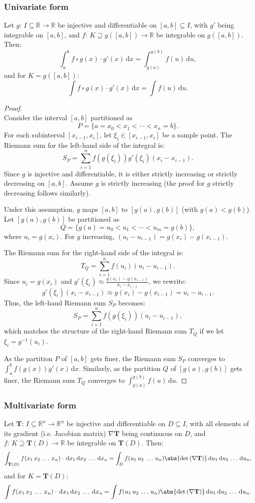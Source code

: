 \documentclass[a4paper,12pt]{report}
\begin{document}
\subsubsection{Univariate form}
Let $g:\,I\subseteq\mathbb{R}\to\mathbb{R}$ be injective and differentiable on $[a,b]\subseteq I$, with $g'$ being integrable on $[a,b]$, and $f:\,K\supseteq g([a,b])\to\mathbb{R}$ be integrable on $g([a,b])$. Then:
\[\int_a^bf\circ g(x)\cdot g'(x)\,\mathrm{d}x=\int_{g(a)}^{g(b)}f(u)\,\mathrm{d}u,\]
and for $K=g([a,b])$:
\[\int f\circ g(x)\cdot g'(x)\,\mathrm{d}x=\int f(u)\,\mathrm{d}u.\]
\begin{proof}\mbox{}\\
Consider the interval \([a, b]\) partitioned as
\[P = \{a = x_0 < x_1 < \cdots < x_n = b\}.\]
For each subinterval \([x_{i-1}, x_i]\), let \(\xi_i \in [x_{i-1}, x_i]\) be a sample point. The Riemann sum for the left-hand side of the integral is:
\[S_P = \sum_{i=1}^n f(g(\xi_i)) g'(\xi_i) (x_i - x_{i-1}).\]
Since \(g\) is injective and differentiable, it is either strictly increasing or strictly decreasing on \([a, b]\). Assume \(g\) is strictly increasing (the proof for \(g\) strictly decreasing follows similarly).

Under this assumption, \(g\) maps \([a, b]\) to \([g(a), g(b)]\) (with \(g(a) < g(b)\)). Let \([g(a), g(b)]\) be partitioned as
\[Q = \{g(a) = u_0 < u_1 < \cdots < u_m = g(b)\},\]
where \(u_i = g(x_i)\). For \(g\) increasing, \((u_i - u_{i-1}) = g(x_i) - g(x_{i-1})\).

The Riemann sum for the right-hand side of the integral is:
\[T_Q = \sum_{i=1}^n f(u_i) (u_i - u_{i-1}).\]
Since \(u_i = g(x_i)\) and \(g'(\xi_i) \approx \frac{g(x_i) - g(x_{i-1})}{x_i - x_{i-1}}\), we rewrite:
\[ g'(\xi_i) (x_i - x_{i-1}) \approx g(x_i) - g(x_{i-1}) = u_i - u_{i-1}. \]
Thus, the left-hand Riemann sum \(S_P\) becomes:
\[ S_P = \sum_{i=1}^n f(g(\xi_i)) (u_i - u_{i-1}),\]
which matches the structure of the right-hand Riemann sum \(T_Q\) if we let \(\xi_i = g^{-1}(u_i)\).

As the partition \(P\) of \([a, b]\) gets finer, the Riemann sum \(S_P\) converges to \(\int_a^b f(g(x)) g'(x) \, \mathrm{d}x\). Similarly, as the partition \(Q\) of \([g(a), g(b)]\) gets finer, the Riemann sum \(T_Q\) converges to \(\int_{g(a)}^{g(b)} f(u) \, \mathrm{d}u\).
\end{proof}
\subsubsection{Multivariate form}
Let $\mathbf{T}:\,I\subseteq\mathbb{R}^n\to\mathbb{R}^n$ be injective and differentiable on $D\subseteq I$, with all elements of its gradient (i.e. Jacobian matrix) $\nabla\mathbf{T}$ being continuous on $D$, and $f:\,K\supseteq\mathbf{T}(D)\to\mathbb{R}$ be integrable on $\mathbf{T}(D)$. Then:
\[\int_{\mathbf{T}(D)}f(x_1\,x_2\,\dots\,x_n)\cdot\,\mathrm{d}x_1\,\mathrm{d}x_2\,\dots\,\mathrm{d}x_n=\int_D f(u_1\,u_2\,\dots\,u_n)\abs{\det\left(\nabla\mathbf{T}\right)}\,\mathrm{d}u_1\,\mathrm{d}u_2\,\dots\,\mathrm{d}u_n,\]
and for $K=\mathbf{T}(D)$:
\[\int f(x_1\,x_2\,\dots\,x_n)\cdot\,\mathrm{d}x_1\,\mathrm{d}x_2\,\dots\,\mathrm{d}x_n=\int f(u_1\,u_2\,\dots\,u_n)\abs{\det\left(\nabla\mathbf{T}\right)}\,\mathrm{d}u_1\,\mathrm{d}u_2\,\dots\,\mathrm{d}u_n.\]
\end{document}
